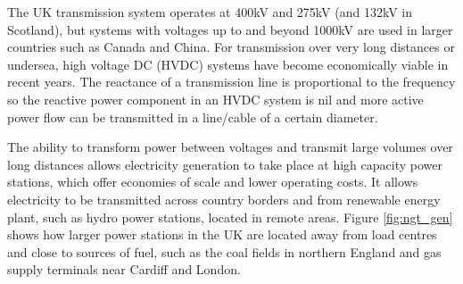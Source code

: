 The UK transmission system operates at 400kV and 275kV (and 132kV in
Scotland), but systems with voltages up to and beyond 1000kV are used in
larger countries such as Canada and China.  For transmission over very long
distances or undersea, high voltage DC (HVDC) systems have become economically
viable in recent years.  The reactance of a transmission line is proportional
to the frequency so the reactive power component in an HVDC system is nil and
more active power flow can be transmitted in a line/cable of a certain
diameter.

The ability to transform power between voltages and transmit large volumes over
long distances allows electricity generation to take place at high capacity
power stations, which offer economies of scale and lower operating costs. It
allows electricity to be transmitted across country borders and from renewable
energy plant, such as hydro power stations, located in remote areas.
Figure \ref{fig:ngt_gen} shows how larger power stations in the UK are located
away from load centres and close to sources of fuel, such as the coal fields
in northern England and gas supply terminals near Cardiff and London.

